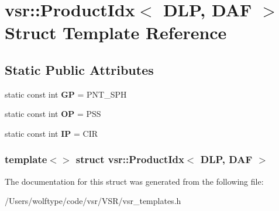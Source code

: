 \hypertarget{structvsr_1_1_product_idx_3_01_d_l_p_00_01_d_a_f_01_4}{\section{vsr\-:\-:Product\-Idx$<$ D\-L\-P, D\-A\-F $>$ Struct Template Reference}
\label{structvsr_1_1_product_idx_3_01_d_l_p_00_01_d_a_f_01_4}
}
\subsection*{Static Public Attributes}
\begin{DoxyCompactItemize}
\item 
\hypertarget{structvsr_1_1_product_idx_3_01_d_l_p_00_01_d_a_f_01_4_a70dcb011ae332f91d2c9ce4c5bcdb9dd}{static const int {\bfseries G\-P} = P\-N\-T\-\_\-\-S\-P\-H}\label{structvsr_1_1_product_idx_3_01_d_l_p_00_01_d_a_f_01_4_a70dcb011ae332f91d2c9ce4c5bcdb9dd}

\item 
\hypertarget{structvsr_1_1_product_idx_3_01_d_l_p_00_01_d_a_f_01_4_a2a44efb6223ff3675b715242c43fac9b}{static const int {\bfseries O\-P} = P\-S\-S}\label{structvsr_1_1_product_idx_3_01_d_l_p_00_01_d_a_f_01_4_a2a44efb6223ff3675b715242c43fac9b}

\item 
\hypertarget{structvsr_1_1_product_idx_3_01_d_l_p_00_01_d_a_f_01_4_abc990f85c15c6bd500d019a9baa03344}{static const int {\bfseries I\-P} = C\-I\-R}\label{structvsr_1_1_product_idx_3_01_d_l_p_00_01_d_a_f_01_4_abc990f85c15c6bd500d019a9baa03344}

\end{DoxyCompactItemize}
\subsubsection*{template$<$$>$ struct vsr\-::\-Product\-Idx$<$ D\-L\-P, D\-A\-F $>$}



The documentation for this struct was generated from the following file\-:\begin{DoxyCompactItemize}
\item 
/\-Users/wolftype/code/vsr/\-V\-S\-R/vsr\-\_\-templates.\-h\end{DoxyCompactItemize}
